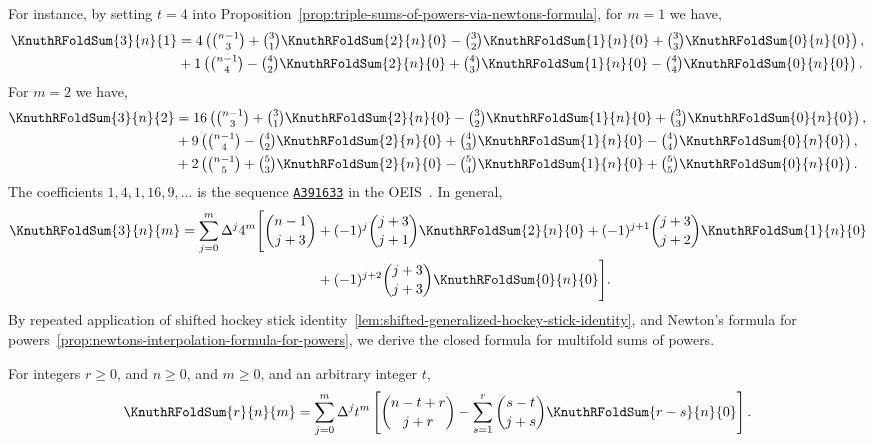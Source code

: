 For instance, by setting $t=4$ into
Proposition~\eqref{prop:triple-sums-of-powers-via-newtons-formula},
for $m=1$ we have,
\begin{align*}
  \KnuthRFoldSum{3}{n}{1}
  &= 4 \left(
    \tbinom{n-1}{3}
    + \tbinom{3}{1} \KnuthRFoldSum{2}{n}{0}
    - \tbinom{3}{2} \KnuthRFoldSum{1}{n}{0}
    + \tbinom{3}{3} \KnuthRFoldSum{0}{n}{0}
  \right), \\
  &+ 1 \left(
    \tbinom{n-1}{4}
    - \tbinom{4}{2} \KnuthRFoldSum{2}{n}{0}
    + \tbinom{4}{3} \KnuthRFoldSum{1}{n}{0}
  - \tbinom{4}{4} \KnuthRFoldSum{0}{n}{0} \right).
\end{align*}
For $m=2$ we have,
\begin{align*}
  \KnuthRFoldSum{3}{n}{2}
  &= 16
  \left(
    \tbinom{n-1}{3}
    + \tbinom{3}{1} \KnuthRFoldSum{2}{n}{0}
    - \tbinom{3}{2} \KnuthRFoldSum{1}{n}{0}
  + \tbinom{3}{3} \KnuthRFoldSum{0}{n}{0} \right), \\
  &+ 9
  \left(
    \tbinom{n-1}{4}
    - \tbinom{4}{2} \KnuthRFoldSum{2}{n}{0}
    + \tbinom{4}{3} \KnuthRFoldSum{1}{n}{0}
    - \tbinom{4}{4} \KnuthRFoldSum{0}{n}{0}
  \right), \\
  &+ 2
  \left( \tbinom{n-1}{5}
    + \tbinom{5}{3} \KnuthRFoldSum{2}{n}{0}
    - \tbinom{5}{4} \KnuthRFoldSum{1}{n}{0}
  + \tbinom{5}{5} \KnuthRFoldSum{0}{n}{0} \right).
\end{align*}
The coefficients $1,4,1,16,9,\dots$ is the sequence
\href{https://oeis.org/A391633}{\texttt{A391633}}
in the OEIS~\cite{sloane2003line}.
In general,
\begin{align*}
  \KnuthRFoldSum{3}{n}{m}
  = \sum_{j=0}^{m} \Delta^{j} 4^m
  \Bigg[
    \binom{n-1}{j+3}
    &+ (-1)^{j} \binom{j+3}{j+1} \KnuthRFoldSum{2}{n}{0}
    + (-1)^{j+1} \binom{j+3}{j+2} \KnuthRFoldSum{1}{n}{0} \\
    &+ (-1)^{j+2} \binom{j+3}{j+3} \KnuthRFoldSum{0}{n}{0}
  \Bigg].
\end{align*}
By repeated application of shifted hockey stick
identity~\eqref{lem:shifted-generalized-hockey-stick-identity},
and Newton's formula for
powers~\eqref{prop:newtons-interpolation-formula-for-powers},
we derive the closed formula for multifold sums of powers.

\begin{theorem}
  \label{theorem:multifold-sums-of-powers-via-newtons-formula}
  For integers $r\geq 0$, and $n\geq 0$, and $m\geq 0$,
  and an arbitrary integer $t$,
  \begin{align*}
    \KnuthRFoldSum{r}{n}{m}
    = \sum_{j=0}^{m} \Delta^{j} t^{m}
    \left[
      \binom{n-t+r}{j+r}
      - \sum_{s=1}^{r} \binom{s-t}{j+s} \KnuthRFoldSum{r-s}{n}{0}
    \right].
  \end{align*}
\end{theorem}

